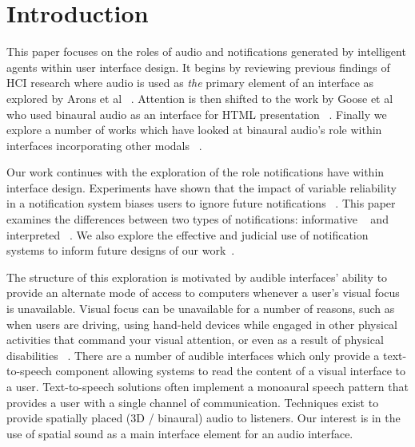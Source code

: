 \newpage                                                 \chapter{Introduction}
\renewcommand{\thepage }{\arabic{page}}                    \setcounter{page}{1}

This paper focuses on the roles of audio and notifications generated by
intelligent agents within user interface design. It begins by reviewing previous
findings of HCI research where audio is used as \textit{the} primary element
of an interface as explored by Arons et al ~\cite{arons1991hyperspeech}. Attention is then
shifted to the work by Goose et al who used binaural audio as an interface for
HTML presentation ~\cite{goose19993dAudio}. Finally we explore a number of works
which have looked at binaural audio's role within interfaces incorporating other
modals ~\cite{ yu2006novel, marentakis2004study}.

Our work continues with the exploration of the role notifications have within
interface design. Experiments have shown that the impact of variable reliability
in a notification system biases users to ignore future notifications
~\cite{leetiernan2001effective}. This paper examines the  differences between
two types of notifications: informative ~\cite{maltz2000cue} and interpreted
~\cite{horvitz1999principles}. We also explore the effective and judicial use of
notification systems to inform future designs of our work~\cite{cutrell2001notification}.

The structure of this exploration is motivated by audible interfaces' ability to
provide an alternate mode of access to computers whenever a user's visual focus
is unavailable. Visual focus can be unavailable for a number of reasons, such as
when users are driving, using hand-held devices while engaged in other physical
activities that command your visual attention, or even as a result of physical
disabilities ~\cite{michelis2008disappearing}. There are a number of audible
interfaces which only provide a text-to-speech component allowing systems
to read the content of a visual interface to a user.  Text-to-speech solutions
often implement a monoaural speech pattern that provides a user with a single
channel of communication. Techniques exist to provide spatially placed (3D /
binaural) audio to listeners.  Our interest is in the use of spatial sound as
a main interface element for an audio interface.

